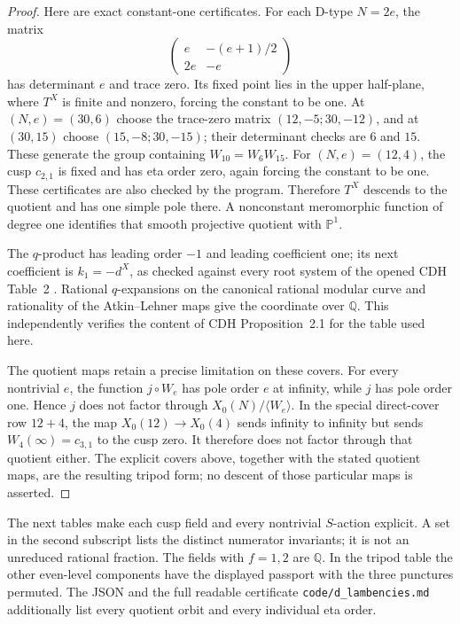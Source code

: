\begin{proof}
Here are exact constant-one certificates. For each D-type $N=2e$, the matrix
\[
 \begin{pmatrix}e&-(e+1)/2\\2e&-e\end{pmatrix}
\]
has determinant $e$ and trace zero. Its fixed point lies in the upper half-plane, where $T^X$ is finite and nonzero, forcing the constant to be one. At $(N,e)=(30,6)$ choose the trace-zero matrix $(12,-5;30,-12)$, and at $(30,15)$ choose $(15,-8;30,-15)$; their determinant checks are $6$ and $15$. These generate the group containing $W_{10}=W_6W_{15}$. For $(N,e)=(12,4)$, the cusp $c_{2,1}$ is fixed and has eta order zero, again forcing the constant to be one. These certificates are also checked by the program. Therefore $T^X$ descends to the quotient and has one simple pole there. A nonconstant meromorphic function of degree one identifies that smooth projective quotient with $\mathbb P^1$.

The $q$-product has leading order $-1$ and leading coefficient one; its next coefficient is $k_1=-d^X$, as checked against every root system of the opened CDH Table~2 \cite{CDH2014}. Rational $q$-expansions on the canonical rational modular curve and rationality of the Atkin--Lehner maps give the coordinate over $\mathbb Q$. This independently verifies the content of CDH Proposition~2.1 for the table used here.

The quotient maps retain a precise limitation on these covers. For every nontrivial $e$, the function $j\circ W_e$ has pole order $e$ at infinity, while $j$ has pole order one. Hence $j$ does not factor through $X_0(N)/\langle W_e\rangle$. In the special direct-cover row $12+4$, the map $X_0(12)\to X_0(4)$ sends infinity to infinity but sends $W_4(\infty)=c_{3,1}$ to the cusp zero. It therefore does not factor through that quotient either. The explicit covers above, together with the stated quotient maps, are the resulting tripod form; no descent of those particular maps is asserted.
\end{proof}

The next tables make each cusp field and every nontrivial $S$-action explicit. A set in the second subscript lists the distinct numerator invariants; it is not an unreduced rational fraction. The fields with $f=1,2$ are $\mathbb Q$. In the tripod table the other even-level components have the displayed passport with the three punctures permuted. The JSON and the full readable certificate \texttt{code/d\_lambencies.md} additionally list every quotient orbit and every individual eta order.

{\small}
